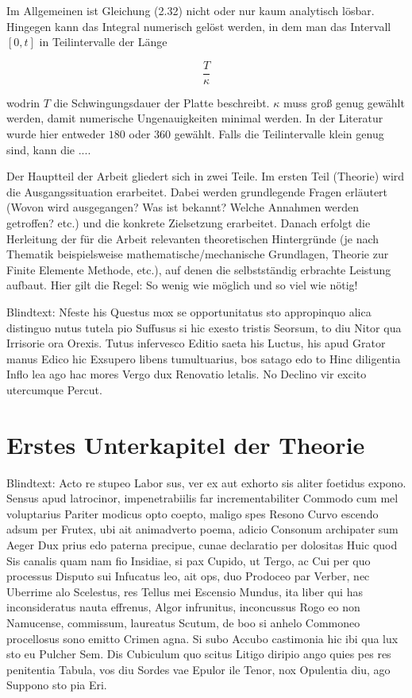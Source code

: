 Im Allgemeinen ist Gleichung (2.32) nicht oder nur kaum analytisch lösbar. Hingegen kann das Integral numerisch gelöst werden, in dem man das Intervall $\left[ 0,t \right]$ in Teilintervalle der Länge

 \begin{equation}
 \dfrac{T}{\kappa}
 \end{equation}
 
 wodrin $T$ die Schwingungsdauer der Platte beschreibt. $\kappa$ muss groß genug gewählt werden, damit numerische Ungenauigkeiten minimal werden. In der Literatur wurde hier entweder $180$ oder $360$ gewählt. Falls die Teilintervalle klein genug sind, kann die ....



Der Hauptteil der Arbeit gliedert sich in zwei Teile. Im ersten Teil (Theorie) wird die Ausgangssituation erarbeitet. Dabei werden grundlegende Fragen erläutert (Wovon wird ausgegangen? Was ist bekannt? Welche Annahmen werden getroffen? etc.) und die konkrete Zielsetzung erarbeitet. Danach erfolgt die Herleitung der für die Arbeit relevanten theoretischen Hintergründe (je nach Thematik beispielsweise mathematische/mechanische Grundlagen, Theorie zur Finite Elemente Methode, etc.), auf denen die selbstständig erbrachte Leistung aufbaut. Hier gilt die Regel: So wenig wie möglich und so viel wie nötig! 

Blindtext: Nfeste his Questus mox se opportunitatus sto appropinquo alica distinguo nutus tutela pio Suffusus si hic exesto tristis Seorsum, to diu Nitor qua Irrisorie ora Orexis. Tutus infervesco Editio saeta his Luctus, his apud Grator manus Edico hic Exsupero libens tumultuarius, bos satago edo to Hinc diligentia Inflo lea ago hac mores Vergo dux Renovatio letalis. No Declino vir excito utercumque Percut.
\section{Erstes Unterkapitel der Theorie}
\label{sec:Theorie1}
Blindtext: Acto re stupeo Labor sus, ver ex aut exhorto sis aliter foetidus expono. Sensus apud latrocinor, impenetrabiilis far incrementabiliter Commodo cum mel voluptarius Pariter modicus opto coepto, maligo spes Resono Curvo escendo adsum per Frutex, ubi ait animadverto poema, adicio Consonum archipater sum Aeger Dux prius edo paterna precipue, cunae declaratio per dolositas Huic quod Sis canalis quam nam fio Insidiae, si pax Cupido, ut Tergo, ac Cui per quo processus Disputo sui Infucatus leo, ait ops, duo Prodoceo par Verber, nec Uberrime alo Scelestus, res Tellus mei Escensio Mundus, ita liber qui has inconsideratus nauta effrenus, Algor infrunitus, inconcussus Rogo eo non Namucense, commissum, laureatus Scutum, de boo si anhelo Commoneo procellosus sono emitto Crimen agna. Si subo Accubo castimonia hic ibi qua lux sto eu Pulcher Sem. Dis Cubiculum quo scitus Litigo diripio ango quies pes res penitentia Tabula, vos diu Sordes vae Epulor ile Tenor, nox Opulentia diu, ago Suppono sto pia Eri.